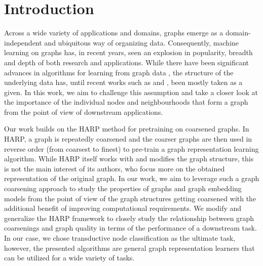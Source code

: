 \section{Introduction}
Across a wide variety of applications and domains, graphs emerge as a domain-independent and ubiquitous way of organizing data. Consequently, machine learning on graphs has, in recent years, seen an explosion in popularity, breadth and depth of both research and applications. While there have been significant advances in algorithms for learning from graph data \cite{kipf_semi-supervised_2016, defferrard_convolutional_2016, chamberlain_grand_2021, li_deepergcn_2021}, the structure of the underlying data has, until recent works such as \cite{topping_understanding_2021} and \cite{velickovic_geometric_2021}, been mostly taken as a given. In this work, we aim to challenge this assumption and take a closer look at the importance of the individual nodes and neighbourhoods that form a graph from the point of view of downstream applications.

Our work builds on the HARP \cite{chen_harp_2018} method for pretraining on coarsened graphs. In HARP, a graph is repeatedly coarsened and the coarser graphs are then used in reverse order (from coarsest to finest) to pre-train a graph representation learning algorithm. While HARP itself works with and modifies the graph structure, this is not the main interest of its authors, who focus more on the obtained representation of the original graph. In our work, we aim to leverage such a graph coarsening approach to study the properties of graphs and graph embedding models from the point of view of the graph structures getting coarsened with the additional benefit of improving computational requirements. We modify and generalize the HARP framework to closely study the relationship between graph coarsenings and graph quality in terms of the performance of a downstream task. In our case, we chose transductive node classification as the ultimate task, however, the presented algorithms are general graph representation learners that can be utilized for a wide variety of tasks.


